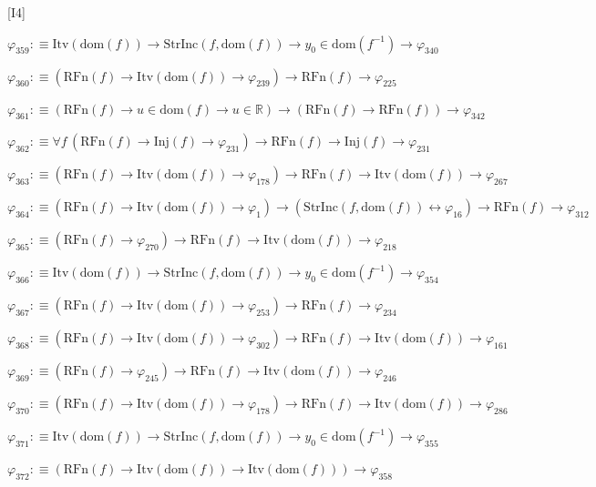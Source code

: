 \begin{fullproof}{[I4]}
\begin{abbrevlist}
\item $\varphi_{359} :\equiv \mathrm{Itv}(\mathrm{dom}(f)) \to \mathrm{StrInc}(f,\mathrm{dom}(f)) \to y_{0} \in \mathrm{dom}(f^{-1}) \to \varphi_{340}$
\item $\varphi_{360} :\equiv (\mathrm{RFn}(f) \to \mathrm{Itv}(\mathrm{dom}(f)) \to \varphi_{239}) \to \mathrm{RFn}(f) \to \varphi_{225}$
\item $\varphi_{361} :\equiv (\mathrm{RFn}(f) \to u \in \mathrm{dom}(f) \to u \in \mathbb{R}) \to (\mathrm{RFn}(f) \to \mathrm{RFn}(f)) \to \varphi_{342}$
\item $\varphi_{362} :\equiv \forall f\,(\mathrm{RFn}(f) \to \mathrm{Inj}(f) \to \varphi_{231}) \to \mathrm{RFn}(f) \to \mathrm{Inj}(f) \to \varphi_{231}$
\item $\varphi_{363} :\equiv (\mathrm{RFn}(f) \to \mathrm{Itv}(\mathrm{dom}(f)) \to \varphi_{178}) \to \mathrm{RFn}(f) \to \mathrm{Itv}(\mathrm{dom}(f)) \to \varphi_{267}$
\item $\varphi_{364} :\equiv (\mathrm{RFn}(f) \to \mathrm{Itv}(\mathrm{dom}(f)) \to \varphi_{1}) \to (\mathrm{StrInc}(f,\mathrm{dom}(f)) \leftrightarrow \varphi_{16}) \to \mathrm{RFn}(f) \to \varphi_{312}$
\item $\varphi_{365} :\equiv (\mathrm{RFn}(f) \to \varphi_{270}) \to \mathrm{RFn}(f) \to \mathrm{Itv}(\mathrm{dom}(f)) \to \varphi_{218}$
\item $\varphi_{366} :\equiv \mathrm{Itv}(\mathrm{dom}(f)) \to \mathrm{StrInc}(f,\mathrm{dom}(f)) \to y_{0} \in \mathrm{dom}(f^{-1}) \to \varphi_{354}$
\item $\varphi_{367} :\equiv (\mathrm{RFn}(f) \to \mathrm{Itv}(\mathrm{dom}(f)) \to \varphi_{253}) \to \mathrm{RFn}(f) \to \varphi_{234}$
\item $\varphi_{368} :\equiv (\mathrm{RFn}(f) \to \mathrm{Itv}(\mathrm{dom}(f)) \to \varphi_{302}) \to \mathrm{RFn}(f) \to \mathrm{Itv}(\mathrm{dom}(f)) \to \varphi_{161}$
\item $\varphi_{369} :\equiv (\mathrm{RFn}(f) \to \varphi_{245}) \to \mathrm{RFn}(f) \to \mathrm{Itv}(\mathrm{dom}(f)) \to \varphi_{246}$
\item $\varphi_{370} :\equiv (\mathrm{RFn}(f) \to \mathrm{Itv}(\mathrm{dom}(f)) \to \varphi_{178}) \to \mathrm{RFn}(f) \to \mathrm{Itv}(\mathrm{dom}(f)) \to \varphi_{286}$
\item $\varphi_{371} :\equiv \mathrm{Itv}(\mathrm{dom}(f)) \to \mathrm{StrInc}(f,\mathrm{dom}(f)) \to y_{0} \in \mathrm{dom}(f^{-1}) \to \varphi_{355}$
\item $\varphi_{372} :\equiv (\mathrm{RFn}(f) \to \mathrm{Itv}(\mathrm{dom}(f)) \to \mathrm{Itv}(\mathrm{dom}(f))) \to \varphi_{358}$

\end{abbrevlist}
\end{fullproof}
